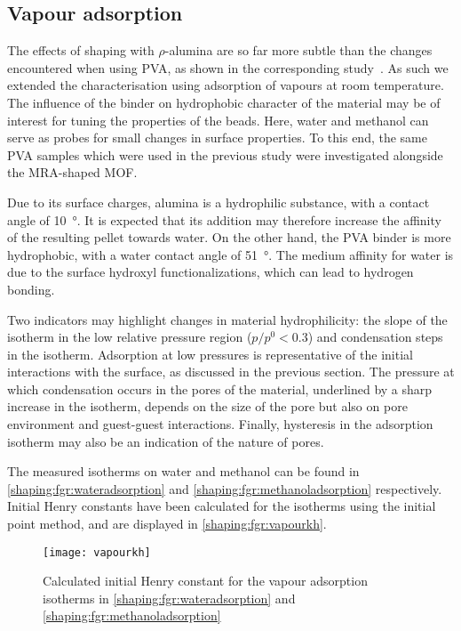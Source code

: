 
\subsection{Vapour adsorption}

The effects of shaping with \(\rho\)-alumina are 
so far more subtle than the changes encountered when using 
PVA, as shown in the corresponding 
study~\cite{chanutObservingEffectsShaping2016}.
As such we extended the characterisation using adsorption
of vapours at room temperature.
The influence of the binder on hydrophobic character of the
material may be of interest for tuning the properties of the 
beads. Here, water and methanol
can serve as probes for small changes in surface properties.
To this end, the same PVA samples which were 
used in the previous study were investigated alongside 
the MRA-shaped MOF.

Due to its surface charges, alumina is a 
hydrophilic substance, with a contact 
angle of \SI{10}{\degree}. It is expected that its 
addition may therefore increase the affinity 
of the resulting pellet towards water. On the other hand,
the PVA binder is more hydrophobic, with a water contact
angle of \SI{51}{\degree}. The medium affinity for water
is due to the surface hydroxyl functionalizations, which
can lead to hydrogen bonding.

Two indicators may highlight changes in material hydrophilicity: 
the slope of the isotherm in the low relative pressure region 
(\(p/p^0 < 0.3\)) and condensation steps in the isotherm. 
Adsorption at low pressures is representative of the initial
interactions with the surface, as discussed in the previous section.
The pressure at which condensation occurs in the pores of the material, 
underlined by a sharp increase in the isotherm, depends on the 
size of the pore but also on pore environment and 
guest-guest interactions. Finally, hysteresis in the adsorption 
isotherm may also be an indication of the nature of pores.

The measured isotherms on water and methanol can be found
in \autoref{shaping:fgr:wateradsorption} 
and \autoref{shaping:fgr:methanoladsorption} respectively.
Initial Henry constants have been calculated for the isotherms
using the initial point method, and are displayed in
\autoref{shaping:fgr:vapourkh}.

\begin{figure}[htb]
    \centering
    \texttt{[image: vapourkh]}%
    \caption{Calculated initial Henry constant for
    the vapour adsorption isotherms 
    in \autoref{shaping:fgr:wateradsorption}
    and \autoref{shaping:fgr:methanoladsorption}}%
    \label{shaping:fgr:vapourkh}
\end{figure}

